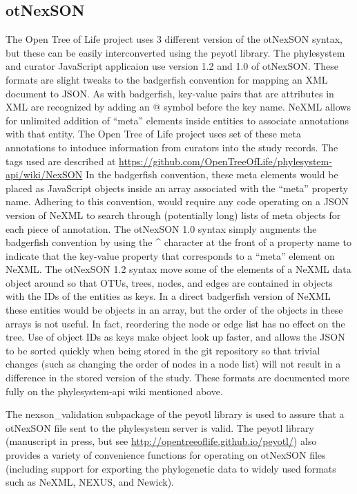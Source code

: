 \documentclass{bioinfo}
\newcommand{\ps}{phylesystem\xspace}
\newcommand{\otol}{Open Tree of Life\xspace}
\newcommand{\nexson}{otNexSON\xspace}
\newcommand{\js}{JavaScript\xspace}
\begin{document}
\begin{methods}
\subsection{\nexson}
The \otol project uses 3 different version of the \nexson syntax, but these
    can be easily interconverted using the peyotl library.
The \ps and curator \js applicaion use version 1.2 and 1.0 of \nexson. 
These formats are slight tweaks to the badgerfish convention \citep{badgerfish} for mapping an XML document to JSON.
As with badgerfish, key-value pairs that are attributes in XML are recognized by adding an @ symbol before the key name.
NeXML allows for unlimited addition of ``meta'' elements inside entities to associate annotations with that entity.
The \otol project uses set of these meta annotations to intoduce information from curators into the study records.
The tags used are described at \url{https://github.com/OpenTreeOfLife/phylesystem-api/wiki/NexSON}
In the badgerfish convention, these meta elements would be placed as \js objects inside an array associated with the ``meta'' property name.
Adhering to this convention, would require any code operating on a JSON version of NeXML to search through (potentially
    long) lists of meta objects for each piece of annotation.
The \nexson 1.0 syntax simply augments the badgerfish convention by using the \^{} character at the front of a
    property name to indicate that the key-value property that corresponds to a ``meta'' element on NeXML.
The \nexson 1.2 syntax move some of the elements of a NeXML data object around so that OTUs, trees, nodes, and edges 
are contained in objects with the IDs of the entities as keys.
In a direct badgerfish version of NeXML these entities would be objects in an array, but the order of the objects
    in these arrays is not useful. In fact, reordering the node or edge list has no effect on the tree.
Use of object IDs as keys make object look up faster, and allows the JSON to be sorted quickly when being stored in 
    the git repository so that trivial changes (such as changing the order of nodes in a node list) will not result in 
    a difference in the stored version of the study.
These formats are documented more fully on the \ps-api wiki mentioned above.

The nexson\_validation subpackage of the peyotl library is used to assure that a \nexson file sent to the \ps
    server is valid.
The peyotl library (manuscript in press, but see \url{http://opentreeoflife.github.io/peyotl/}) also 
    provides a variety of convenience functions for operating on \nexson files (including support
    for exporting the phylogenetic data to widely used formats such as NeXML, NEXUS, and Newick).


\end{methods}
\end{document}
